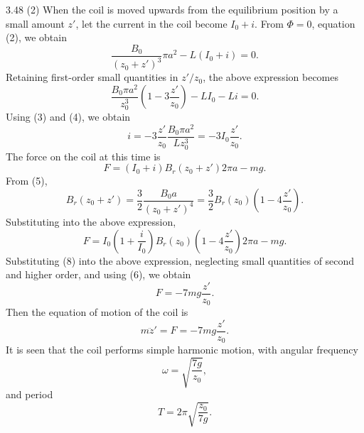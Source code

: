 \begin{solution}{3.48}
(2) When the coil is moved upwards from the equilibrium position by a small amount $z'$, let the current in the coil become $I_0+i$. From $\Phi=0$, equation (2), we obtain
\[
\frac{B_0}{(z_0+z')^3}\pi a^2-L(I_0+i)=0.
\]
Retaining first-order small quantities in $z'/z_0$, the above expression becomes
\[
\frac{B_0\pi a^2}{z_0^3}\left(1-3\frac{z'}{z_0}\right)-LI_0-Li=0.
\]
Using (3) and (4), we obtain
\begin{equation}
i=-3\frac{z'}{z_0}\frac{B_0\pi a^2}{Lz_0^3}=-3I_0\frac{z'}{z_0}. \tag{8}
\end{equation}
The force on the coil at this time is
\[
F=(I_0+i)B_r(z_0+z')2\pi a-mg.
\]
From (5),
\[
B_r(z_0+z')=\frac{3}{2}\frac{B_0a}{(z_0+z')^4}=\frac{3}{2}B_r(z_0)\left(1-4\frac{z'}{z_0}\right).
\]
Substituting into the above expression,
\[
F=I_0\left(1+\frac{i}{I_0}\right)B_r(z_0)\left(1-4\frac{z'}{z_0}\right)2\pi a-mg.
\]
Substituting (8) into the above expression, neglecting small quantities of second and higher order, and using (6), we obtain
\[
F=-7mg\frac{z'}{z_0}.
\]
Then the equation of motion of the coil is
\[
m\ddot{z}'=F=-7mg\frac{z'}{z_0}.
\]
It is seen that the coil performs simple harmonic motion, with angular frequency
\[
\omega=\sqrt{\frac{7g}{z_0}},
\]
and period
\[
T=2\pi\sqrt{\frac{z_0}{7g}}.
\]
\end{solution}


